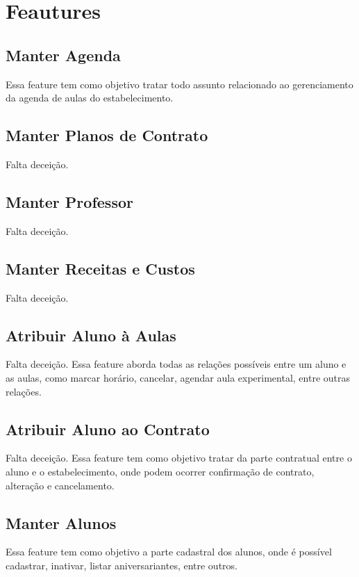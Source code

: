 \section[Features]{Feautures}
\subsection[Manter Agenda]{Manter Agenda}
Essa feature tem como objetivo tratar todo assunto relacionado ao gerenciamento
da agenda de aulas do estabelecimento.

\subsection[Manter Planos de Contrato]{Manter Planos de Contrato}
Falta deceição.

\subsection[Manter Professor]{Manter Professor}
Falta deceição.

\subsection[Manter Receitas e Custos]{Manter Receitas e Custos}
Falta deceição.

\subsection[Atribuir Aluno à Aulas]{Atribuir Aluno à Aulas}
Falta deceição.
Essa feature aborda todas as relações possíveis entre um aluno e as aulas,
como marcar horário, cancelar, agendar aula experimental, entre outras relações.

\subsection[Atribuir Aluno ao Contrato]{Atribuir Aluno ao Contrato}
Falta deceição.
Essa feature tem como objetivo tratar da parte contratual entre o aluno e o
estabelecimento, onde podem ocorrer confirmação de contrato, alteração e
cancelamento.

\subsection[Manter Alunos]{Manter Alunos}
Essa feature tem como objetivo a parte cadastral dos alunos, onde é possível
cadastrar, inativar, listar aniversariantes, entre outros.
